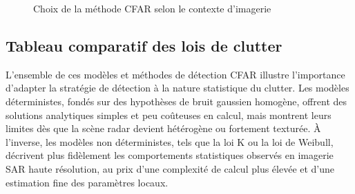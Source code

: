\begin{figure}[h!]
\centering
{}
\caption{Choix de la méthode CFAR selon le contexte d’imagerie}
\end{figure}

\subsection{Tableau comparatif des lois de clutter}

L’ensemble de ces modèles et méthodes de détection CFAR illustre l’importance d’adapter la stratégie de détection à la nature statistique du clutter.  
Les modèles déterministes, fondés sur des hypothèses de bruit gaussien homogène, offrent des solutions analytiques simples et peu coûteuses en calcul, mais montrent leurs limites dès que la scène radar devient hétérogène ou fortement texturée.  
À l’inverse, les modèles non déterministes, tels que la loi K ou la loi de Weibull, décrivent plus fidèlement les comportements statistiques observés en imagerie SAR haute résolution, au prix d’une complexité de calcul plus élevée et d’une estimation fine des paramètres locaux.

